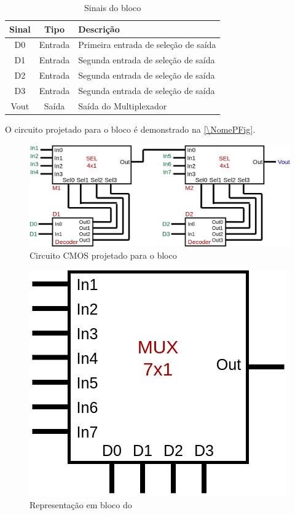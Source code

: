 \begin{table}[htbp]
\caption{Sinais do bloco \NomeBloco}
\label{\NomeSTab}
\centering
\begin{tabular}{ccl}

    \toprule
    Sinal & Tipo    & Descrição        \\
    \midrule \midrule
    D0    & Entrada & Primeira entrada de seleção de sa\'ida \\
    \midrule
    D1    & Entrada & Segunda entrada de seleção de sa\'ida \\
    \midrule
    D2    & Entrada & Segunda entrada de seleção de sa\'ida \\
    \midrule
    D3    & Entrada & Segunda entrada de seleção de sa\'ida \\
    \midrule
    Vout & Sa\'ida & Sa\'ida do Multiplexador\\
    \midrule
    \bottomrule
\end{tabular}
\end{table}

O circuito projetado para o bloco \'e demonstrado na \autoref{\NomePFig}.

\begin{figure}[htbp]
 \centering
    \centering
    \caption{\label{\NomePFig}Circuito CMOS projetado para o bloco \NomeBloco}
    \includegraphics[scale=0.3]{Circuitos/mux7x1.png}
\end{figure}

\begin{figure}[htbp]
 \centering
    \centering
    \caption{\label{\NomeSFig}Representação em bloco do \NomeBloco} 
    \includegraphics[scale=0.3]{Circuitos/mux7x1_block.png}
\end{figure}